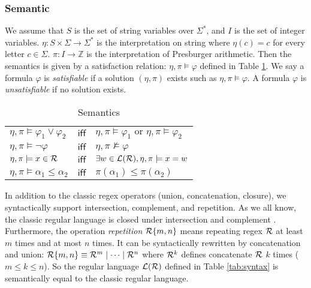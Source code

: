 \subsubsection{Semantic}
We assume that $S$ is the set of string variables over $\Sigma^*$, and $I$ is the set of integer variables. $\eta: S\times\Sigma\rightarrow\Sigma^*$ is the interpretation on string where $\eta(c)=c$ for every letter $c\in \Sigma$. $\pi: I\rightarrow\mathbb{Z}$ is the interpretation of Presburger arithmetic. Then the semantics is given by a satisfaction relation: $\eta, \pi\models \varphi$ defined in Table \ref{tab:semantics}. We say a formula $\varphi$ is \emph{satisfiable} if a solution $(\eta, \pi)$ exists such as $\eta, \pi\models \varphi$. A formula $\varphi$ is \emph{unsatisfiable} if no solution exists.
\begin{table}[h]
  \centering
  \begin{tabular}{lcl}
    $\eta,\pi \models \varphi_1\vee \varphi_2$ & $\mathsf{iff}$ & $\eta,\pi \models \varphi_1 \text{ or } \eta,\pi \models \varphi_2$ \\
    $\eta,\pi \models \neg\varphi $            & $\mathsf{iff}$ & $\eta,\pi \not\models \varphi$                                      \\
    $\eta, \pi \models x\in \mathcal{R}$            & $\mathsf{iff}$ & $\exists w \in \mathcal{L}(\mathcal{R}),\eta,\pi \models x = w$                 \\
    $\eta, \pi \models \alpha_1 \leq \alpha_2$ & $\mathsf{iff}$ & $\pi(\alpha_1) \leq \pi(\alpha_2) $                                 \\
  \end{tabular}
  \caption{Semantics}
  \label{tab:semantics}
\end{table}
In addition to the classic regex operators (union, concatenation, closure), we syntactically support intersection, complement, and repetition. As we all know, the classic regular language is closed under intersection and complement \cite{aut_hopcraft}. Furthermore, the operation \emph{repetition} $\mathcal{R}\{m,n\}$ means repeating regex $\mathcal{R}$ at least $m$ times and at most $n$ times. It can be syntactically rewritten by concatenation and union:
$\mathcal{R}\{m,n\} \equiv \mathcal{R}^m\mid\cdots\mid\mathcal{R}^n$ where $\mathcal{R}^k$ defines concatenate $\mathcal{R}$ $k$ times ($m\leq k\leq n$). So the regular language $\mathcal{L}(\mathcal{R})$ defined in Table \ref{tab:syntax} is semantically equal to the classic regular language.

%